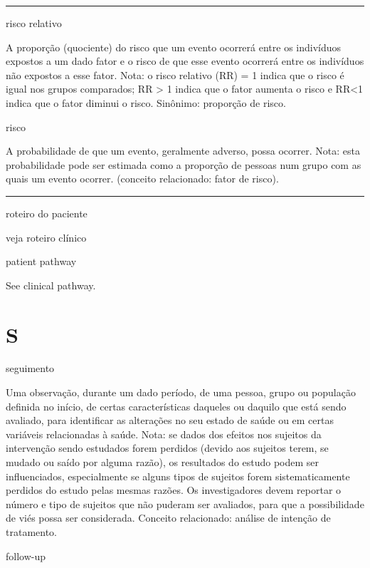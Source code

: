 \documentclass[
  openany]{book}
\begin{document}
\begin{center}\rule{0.5\linewidth}{0.5pt}\end{center}

risco relativo

A proporção (quociente) do risco que um evento ocorrerá entre os indivíduos expostos a um dado fator e o risco de que esse evento ocorrerá entre os indivíduos não expostos a esse fator. Nota: o risco relativo (RR) = 1 indica que o risco é igual nos grupos comparados; RR \textgreater{} 1 indica que o fator aumenta o risco e RR\textless1 indica que o fator diminui o risco. Sinônimo: proporção de risco.

risco

A probabilidade de que um evento, geralmente adverso, possa ocorrer. Nota: esta probabilidade pode ser estimada como a proporção de pessoas num grupo com as quais um evento ocorrer. (conceito relacionado: fator de risco).

\begin{center}\rule{0.5\linewidth}{0.5pt}\end{center}

roteiro do paciente

veja roteiro clínico

patient pathway

See clinical pathway.

\hypertarget{s}{%
\chapter*{S}\label{s}}

seguimento

Uma observação, durante um dado período, de uma pessoa, grupo ou população definida no início, de certas características daqueles ou daquilo que está sendo avaliado, para identificar as alterações no seu estado de saúde ou em certas variáveis relacionadas à saúde. Nota: se dados dos efeitos nos sujeitos da intervenção sendo estudados forem perdidos (devido aos sujeitos terem, se mudado ou saído por alguma razão), os resultados do estudo podem ser influenciados, especialmente se alguns tipos de sujeitos forem sistematicamente perdidos do estudo pelas mesmas razões. Os investigadores devem reportar o número e tipo de sujeitos que não puderam ser avaliados, para que a possibilidade de viés possa ser considerada. Conceito relacionado: análise de intenção de tratamento.

follow-up
\end{document}

